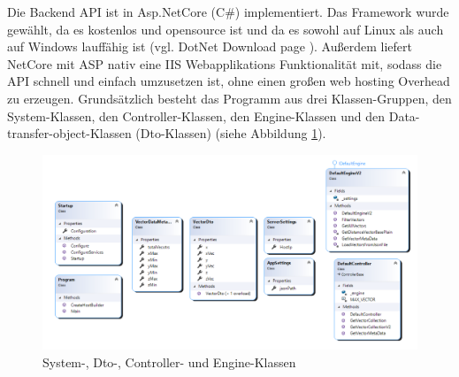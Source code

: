Die Backend API ist in Asp.NetCore (C\#) implementiert.
Das Framework wurde gewählt, da es kostenlos und opensource
ist und da es sowohl auf Linux als auch auf Windows lauffähig ist
(vgl. DotNet Download page \cite{DotNetDownloadPage}).
Außerdem liefert NetCore mit ASP nativ eine IIS Webapplikations
Funktionalität mit, sodass die API schnell und einfach umzusetzen ist,
ohne einen großen web hosting Overhead zu erzeugen. Grundsätzlich
besteht das Programm aus drei Klassen-Gruppen, den System-Klassen,
den Controller-Klassen, den Engine-Klassen und den Data-transfer-object-Klassen (Dto-Klassen) (siehe Abbildung \ref{fig:ClassDiagram}).\\
\begin{figure}[H]
	\centering
	\includegraphics[width=\linewidth]{images/backend/classDiagram}
	\caption{System-, Dto-, Controller- und Engine-Klassen}
	\label{fig:ClassDiagram}
\end{figure}
